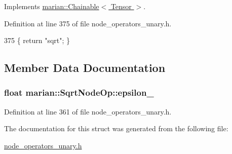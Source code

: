 Implements \hyperlink{classmarian_1_1Chainable_a2b7a5cbdac7a7d3bd7d781a6ff148fc3}{marian\+::\+Chainable$<$ Tensor $>$}.



Definition at line 375 of file node\+\_\+operators\+\_\+unary.\+h.


\begin{DoxyCode}
375 \{ \textcolor{keywordflow}{return} \textcolor{stringliteral}{"sqrt"}; \}
\end{DoxyCode}


\subsection{Member Data Documentation}
\subsubsection[{\texorpdfstring{epsilon\+\_\+}{epsilon_}}]{\setlength{\rightskip}{0pt plus 5cm}float marian\+::\+Sqrt\+Node\+Op\+::epsilon\+\_\+}\hypertarget{structmarian_1_1SqrtNodeOp_a208345df36afd03a7536ad751127ac89}{}\label{structmarian_1_1SqrtNodeOp_a208345df36afd03a7536ad751127ac89}


Definition at line 361 of file node\+\_\+operators\+\_\+unary.\+h.



The documentation for this struct was generated from the following file\+:\begin{DoxyCompactItemize}
\item 
\hyperlink{node__operators__unary_8h}{node\+\_\+operators\+\_\+unary.\+h}\end{DoxyCompactItemize}
